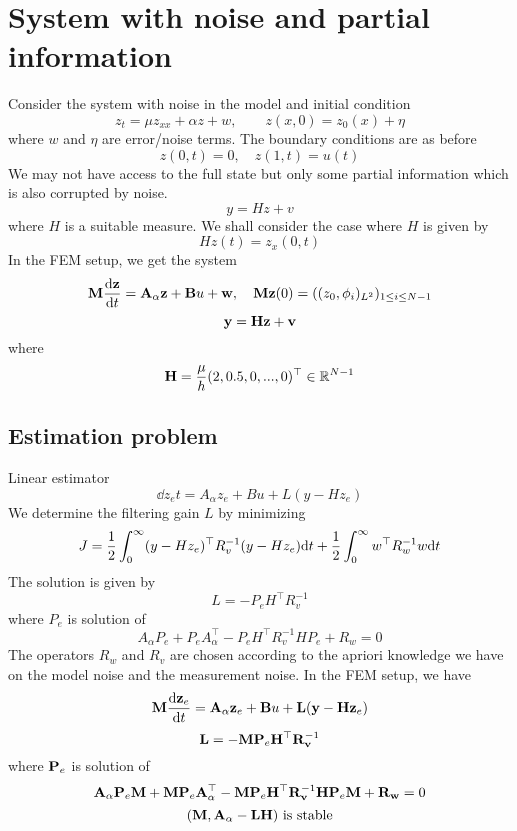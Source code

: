 \documentclass[12pt]{article}
\begin{document}
\section{System with noise and partial information}
Consider the system with noise in the model and initial condition
\[
z_t = \mu z_{xx} + \alpha z + w, \qquad z(x,0) = z_0(x) + \eta
\]
where $w$ and $\eta$ are error/noise terms. The boundary conditions are as before
\[
z(0,t) = 0, \quad z(1,t) = u(t)
\]
We may not have access to the full state but only some partial information which is also corrupted by noise.
\[
y = Hz  + v
\]
where $H$ is a suitable measure. We shall consider the case where $H$ is given by
\[
 Hz(t) = z_x(0,t)
\]
In the FEM setup, we get the system
\[
 {\mathbf M} \frac{\textrm{d} {\mathbf z}}{\textrm{d} t} = {\mathbf A}_\alpha {\mathbf z} + {\mathbf B} u + {\mathbf w} , \quad {\mathbf M} {\mathbf z}(0) = ((z_0,\phi_i)_{L^2})_{1\le i \le {N-1}}
\]
\[
 {\mathbf y} = {\mathbf H} {\mathbf z} + {\mathbf v}
\]
where 
\[
 {\mathbf H} = \frac{\mu}{h}(2,0.5,0,...,0)^\top \in \mathbb{R}^{N-1}
\]



\subsection{Estimation problem}
Linear estimator
\[
\dd{z_e}{t} = A_\alpha z_e + B u + L(y - H z_e)
\]
We determine the filtering gain $L$ by minimizing
\[
J = \frac{1}{2} \int_0^\infty (y - H z_e)^\top R^{-1}_v (y - H z_e) \textrm{d} t +    \frac{1}{2} \int_0^\infty w^\top R_w^{-1} w \textrm{d} t
\]
The solution is given by
\[
L = - P_e H^\top R^{-1}_v
\]
where $P_e$ is solution of
\[
A_\alpha P_e + P_e A_\alpha^\top - P_e H^\top R_v^{-1}  H P_e + R_w = 0
\]
The operators $R_w$ and $R_v$ are chosen according to the apriori knowledge we have on the model noise and the measurement noise. In the FEM setup, we have
\[
{\mathbf M} \frac{\textrm{d} {\mathbf z}_e}{\textrm{d} t} = {\mathbf A}_\alpha {\mathbf z}_e + {\mathbf B} u + {\mathbf L}({\mathbf y} - {\mathbf H} {\mathbf z}_e)
\]
\[
{\mathbf L} = - {\mathbf M} {\mathbf P}_e {\mathbf H}^\top {\mathbf R}^{-1}_{\mathbf v}
\]
where ${\mathbf P}_e$ is solution of
\[
{\mathbf A}_\alpha {\mathbf P}_e {\mathbf M} + {\mathbf M} {\mathbf P}_e {\mathbf A}_\alpha^\top - {\mathbf M} {\mathbf P}_e {\mathbf H}^\top {\mathbf R}_{\mathbf v}^{-1}  {\mathbf H} {\mathbf P}_e {\mathbf M} + {\mathbf R}_{\mathbf w} = 0
\]
\[
 ({\mathbf M},{\mathbf A}_\alpha - {\mathbf L} {\mathbf H}) \text{ is stable} 
\]

\end{document}

